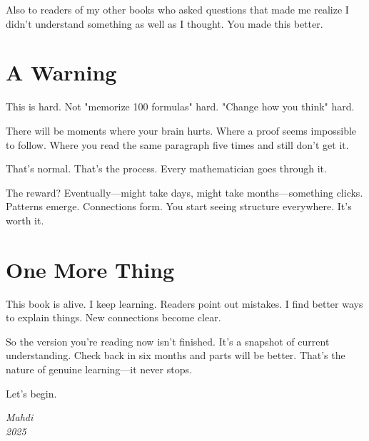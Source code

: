Also to readers of my other books who asked questions that made me realize I didn't understand something as well as I thought. You made this better.

\section*{A Warning}

This is hard. Not "memorize 100 formulas" hard. "Change how you think" hard.

There will be moments where your brain hurts. Where a proof seems impossible to follow. Where you read the same paragraph five times and still don't get it.

That's normal. That's the process. Every mathematician goes through it.

The reward? Eventually—might take days, might take months—something clicks. Patterns emerge. Connections form. You start seeing structure everywhere. It's worth it.

\section*{One More Thing}

This book is alive. I keep learning. Readers point out mistakes. I find better ways to explain things. New connections become clear.

So the version you're reading now isn't finished. It's a snapshot of current understanding. Check back in six months and parts will be better. That's the nature of genuine learning—it never stops.

Let's begin.

\vfill
\begin{flushright}
\textit{Mahdi}\\
\textit{2025}
\end{flushright}

\clearpage